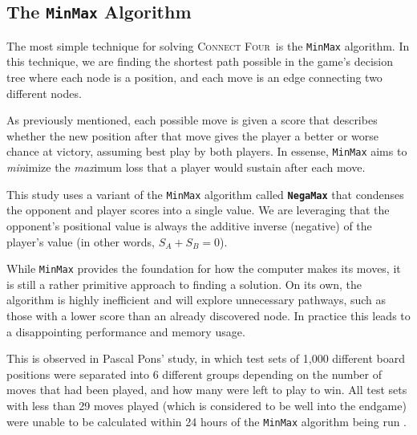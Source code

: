 \documentclass[12pt]{article}
\newcommand{\name}{\textsc{Connect Four}}
\begin{document}

\subsection{The \texttt{MinMax} Algorithm}
The most simple technique for solving \name\ is the \texttt{MinMax} algorithm. In this technique, we are finding the shortest path possible in the game's decision tree where each node is a position, and each move is an edge connecting two different nodes.

As previously mentioned, each possible move is given a score that describes whether the new position after that move gives the player a better or worse chance at victory, assuming best play by both players. In essense, \texttt{MinMax} aims to \textit{min}imize the \textit{max}imum loss that a player would sustain after each move.


This study uses a variant of the \texttt{MinMax} algorithm called \texttt{\textbf{NegaMax}} that condenses the opponent and player scores into a single value.  We are leveraging that the opponent's positional value is always the additive inverse (negative) of the player's value (in other words, $S_A + S_B = 0$).

While \texttt{MinMax} provides the foundation for how the computer makes its moves, it is still a rather primitive approach to finding a solution.  On its own, the algorithm is highly inefficient and will explore unnecessary pathways, such as those with a lower score than an already discovered node.  In practice this leads to a disappointing performance and memory usage.

This is observed in Pascal Pons' study, in which test sets of 1,000 different board positions were separated into 6 different groups depending on the number of moves that had been played, and how many were left to play to win. All test sets with less than 29 moves played (which is considered to be well into the endgame) were unable to be calculated within 24 hours of the \texttt{MinMax} algorithm being run \cite{solvingconnect}.
\end{document}
